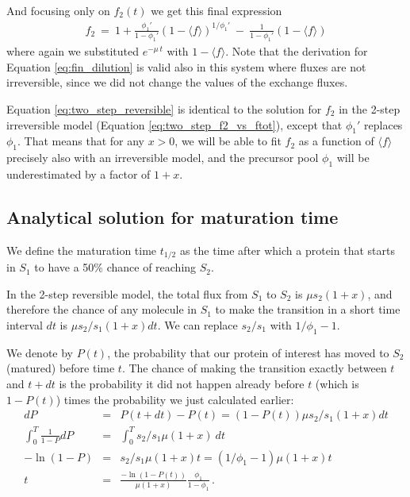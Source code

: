 \documentclass{article}
\newcommand{\fin}{\ensuremath{\langle f \rangle}}
\begin{document}
And focusing only on $f_2(t)$ we get this final expression
\begin{eqnarray}
    f_2 ~=~ 1 + \frac{\phi_1'}{1 - \phi_1'} (1-\fin)^{1/\phi_1'} ~-~ \frac{1}{1 - \phi_1'} (1-\fin)
	\label{eq:two_step_reversible}
\end{eqnarray}
where again we substituted $e^{-\mu\,t}$ with $1-\fin$. Note that the derivation for Equation \ref{eq:fin_dilution} is valid also in this system where fluxes are not irreversible, since we did not change the values of the exchange fluxes.

Equation \ref{eq:two_step_reversible} is identical to the solution for $f_2$ in the 2-step irreversible model (Equation \ref{eq:two_step_f2_vs_ftot}), except that $\phi_1'$ replaces $\phi_1$. That means that for any $x > 0$, we will be able to fit $f_2$ as a function of $\fin$ precisely also with an irreversible model, and the precursor pool $\phi_1$ will be underestimated by a factor of $1+x$.

\subsection{Analytical solution for maturation time}
We define the maturation time $t_{1/2}$ as the time after which a protein that starts in $S_1$ to have a 50\% chance of reaching $S_2$. 

In the 2-step reversible model, the total flux from $S_1$ to $S_2$ is $\mu s_2 (1+x)$, and therefore the chance of any molecule in $S_1$ to make the transition in a short time interval $dt$ is $\mu s_2/s_1 (1+x) dt$. We can replace $s_2/s_1$ with $1/\phi_1 - 1$.

We denote by $P(t)$, the probability that our protein of interest has moved to $S_2$ (matured) before time $t$. The chance of making the transition exactly between $t$ and $t+dt$ is the probability it did not happen already before $t$ (which is $1 - P(t)$) times the probability we just calculated earlier:
\begin{eqnarray}
    dP &=& P(t + dt) - P(t) = \left(1 - P(t)\right) \mu s_2/s_1 (1+x) dt \\
    \int_0^T \frac{1}{1-P} dP &=& \int_0^T s_2/s_1 \mu (1+x)~dt  \\
    -\ln(1-P) &=& s_2/s_1 \mu (1+x)t = (1/\phi_1 - 1)\mu (1+x)t  \\
    t &=& \frac{-\ln(1-P(t))}{\mu (1+x)} \frac{\phi_1}{1 - \phi_1}\,.
\end{eqnarray}
\end{document}
